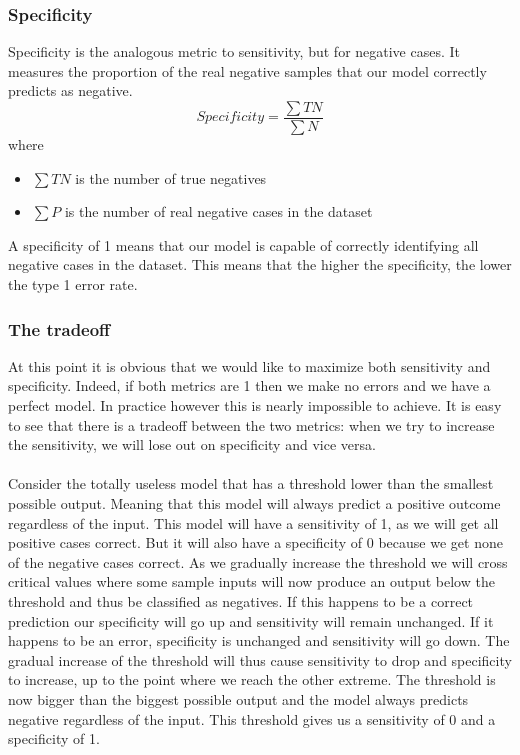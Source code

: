 \subsubsection{Specificity}
Specificity is the analogous metric to sensitivity, but for negative cases. It measures the proportion of the real negative samples that our model correctly predicts as negative.
$$
Specificity = \frac{\sum{TN}}{\sum{N}}
$$
where
\begin{itemize}
\item $\sum{TN}$ is the number of true negatives
\item $\sum{P}$ is the number of real negative cases in the dataset
\end{itemize}
A specificity of 1 means that our model is capable of correctly identifying all negative cases in the dataset. This means that the higher the specificity, the lower the type 1 error rate.
\subsubsection{The tradeoff}
At this point it is obvious that we would like to maximize both sensitivity and specificity. Indeed, if both metrics are 1 then we make no errors and we have a perfect model. In practice however this is nearly impossible to achieve. It is easy to see that there is a tradeoff between the two metrics: when we try to increase the sensitivity, we will lose out on specificity and vice versa. \\ \\ 
Consider the totally useless model that has a threshold lower than the smallest possible output. Meaning that this model will always predict a positive outcome regardless of the input. This model will have a sensitivity of 1, as we will get all positive cases correct. But it will also have a specificity of 0 because we get none of the negative cases correct. As we gradually increase the threshold we will cross critical values where some sample inputs will now produce an output below the threshold and thus be classified as negatives. If this happens to be a correct prediction our specificity will go up and sensitivity will remain unchanged. If it happens to be an error, specificity is unchanged and sensitivity will go down. The gradual increase of the threshold will thus cause sensitivity to drop and specificity to increase, up to the point where we reach the other extreme. The threshold is now bigger than the biggest possible output and the model always predicts negative regardless of the input. This threshold gives us a sensitivity of 0 and a specificity of 1.
